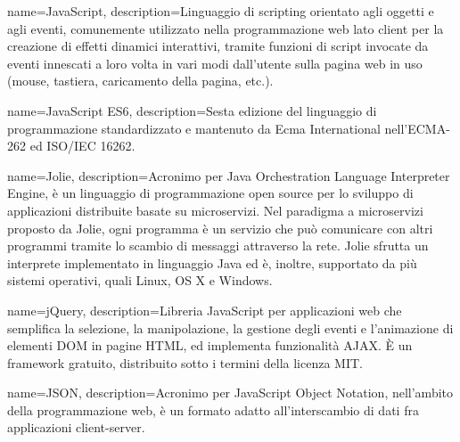 {
	name=JavaScript,
	description={Linguaggio di scripting orientato agli oggetti e agli eventi, comunemente utilizzato nella programmazione web lato client per la creazione di effetti dinamici interattivi, tramite funzioni di script invocate da eventi innescati a loro volta in vari modi dall'utente sulla pagina web in uso (mouse, tastiera, caricamento della pagina, etc.).}
}

{
	name=JavaScript ES6,
	description={Sesta edizione del linguaggio di programmazione standardizzato e mantenuto da Ecma International nell'ECMA-262 ed ISO/IEC 16262.}
}


{
	name=Jolie,
	description={Acronimo per Java Orchestration Language Interpreter Engine, è un linguaggio di programmazione open source per lo sviluppo di applicazioni distribuite basate su microservizi. Nel paradigma a microservizi proposto da Jolie, ogni programma è un servizio che può comunicare con altri programmi tramite lo scambio di messaggi attraverso la rete. Jolie sfrutta un interprete implementato in linguaggio Java ed è, inoltre, supportato da più sistemi operativi, quali Linux, OS X e Windows.}
}

{
	name=jQuery,
	description={Libreria JavaScript per applicazioni web che semplifica la selezione, la manipolazione, la gestione degli eventi e l'animazione di elementi DOM in pagine HTML, ed implementa funzionalità AJAX. \MakeUppercase{è} un framework gratuito, distribuito sotto i termini della licenza MIT.}
}

{
	name=JSON,
	description={Acronimo per JavaScript Object Notation, nell'ambito della programmazione web, è un formato adatto all'interscambio di dati fra applicazioni client-server.}
}
